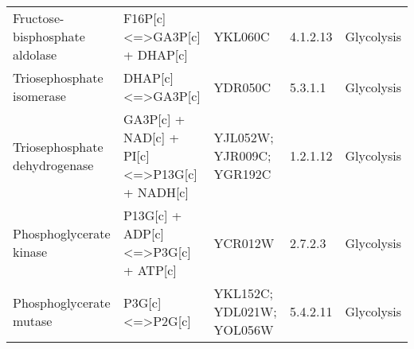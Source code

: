 {\begin{landscape}
\begin{longtable}{p{.25\linewidth} | p{.40\linewidth} | p{.19\linewidth} | p{.05\linewidth} | p{.10\linewidth}}
Fructose-bisphosphate aldolase                                                            & F16P{[}c{]} \textless{}=\textgreater GA3P{[}c{]} + DHAP{[}c{]}                                                                                  & YKL060C                                                                                                                                                          & 4.1.2.13           & Glycolysis                                                                  \\
Triosephosphate isomerase                                                                 & DHAP{[}c{]} \textless{}=\textgreater GA3P{[}c{]}                                                                                                & YDR050C                                                                                                                                                          & 5.3.1.1            & Glycolysis                                                                  \\
Triosephosphate dehydrogenase                                                             & GA3P{[}c{]} + NAD{[}c{]} + PI{[}c{]} \textless{}=\textgreater P13G{[}c{]} + NADH{[}c{]}                                                         & YJL052W; YJR009C; YGR192C                                                                                                                                        & 1.2.1.12           & Glycolysis                                                                  \\
Phosphoglycerate kinase                                                                   & P13G{[}c{]} + ADP{[}c{]} \textless{}=\textgreater P3G{[}c{]} + ATP{[}c{]}                                                                       & YCR012W                                                                                                                                                          & 2.7.2.3            & Glycolysis                                                                  \\
Phosphoglycerate mutase                                                                   & P3G{[}c{]} \textless{}=\textgreater P2G{[}c{]}                                                                                                  & YKL152C; YDL021W; YOL056W                                                                                                                                        & 5.4.2.11           & Glycolysis                                                                  \\

\end{longtable}
\end{landscape}}
